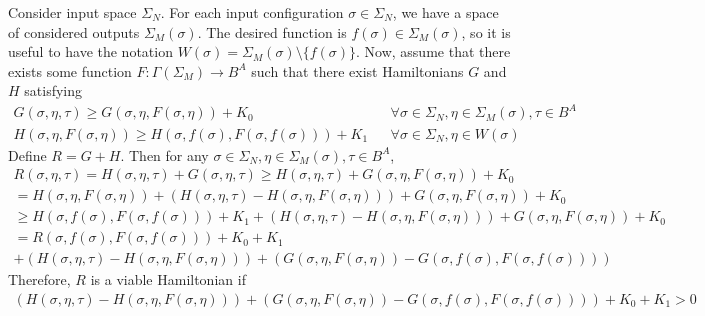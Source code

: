 \documentclass{article}
\begin{document}
Consider input space $\Sigma_N$. For each input configuration $\sigma \in \Sigma_N$, we have a space of considered outputs $\Sigma_M(\sigma)$. The desired function is $f(\sigma) \in \Sigma_M(\sigma)$, so it is useful to have the notation $W(\sigma) = \Sigma_M(\sigma) \setminus \{f(\sigma)\}$. Now, assume that there exists some function $F : \Gamma(\Sigma_M) \longrightarrow B^A$ such that there exist Hamiltonians $G$ and $H$ satisfying
\begin{align}
	G(\sigma, \eta, \tau) \geq G(\sigma, \eta, F(\sigma, \eta)) + K_0 &&\forall \sigma \in \Sigma_N, \eta \in \Sigma_M(\sigma), \tau \in B^A\\
	H(\sigma, \eta, F(\sigma, \eta)) \geq H(\sigma, f(\sigma), F(\sigma, f(\sigma))) + K_1 && \forall \sigma \in \Sigma_N, \eta \in W(\sigma)
\end{align}
Define $R = G + H$. Then for any $\sigma \in \Sigma_N, \eta \in \Sigma_M(\sigma), \tau \in B^A$, 
\begin{align}
	R(\sigma, \eta, \tau) = H(\sigma, \eta, \tau) + G(\sigma, \eta, \tau) \geq H(\sigma, \eta, \tau) + G(\sigma, \eta, F(\sigma, \eta)) + K_0\\
	= H(\sigma, \eta, F(\sigma, \eta)) + (H(\sigma, \eta, \tau) - H(\sigma, \eta, F(\sigma, \eta))) + G(\sigma, \eta, F(\sigma, \eta)) + K_0\\
	\geq H(\sigma, f(\sigma), F(\sigma, f(\sigma))) + K_1 + (H(\sigma, \eta, \tau) - H(\sigma, \eta, F(\sigma, \eta))) + G(\sigma, \eta, F(\sigma, \eta)) + K_0\\
	= R(\sigma, f(\sigma), F(\sigma, f(\sigma))) + K_0 + K_1\\
	+(H(\sigma, \eta, \tau) - H(\sigma, \eta, F(\sigma, \eta))) + (G(\sigma, \eta, F(\sigma, \eta)) - G(\sigma, f(\sigma), F(\sigma, f(\sigma))))
\end{align}
Therefore, $R$ is a viable Hamiltonian if
\begin{align}
	(H(\sigma, \eta, \tau) - H(\sigma, \eta, F(\sigma, \eta))) + (G(\sigma, \eta, F(\sigma, \eta)) - G(\sigma, f(\sigma), F(\sigma, f(\sigma)))) + K_0 + K_1 > 0
\end{align}
\end{document}
